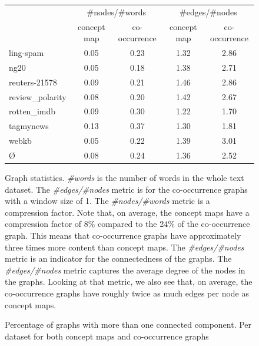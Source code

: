 

\begin{figure}[ht]
\centering
\begin{tabular}{lcccc}
{} &  \multicolumn{2}{c}{\#nodes/\#words} &  \multicolumn{2}{c}{\#edges/\#nodes} \\
{} & concept map &  co-occurrence &  concept map &  co-occurrence \\
\midrule
ling-spam       & 0.05 & 0.23 & 1.32 & 2.86 \\
ng20            & 0.05 & 0.18 & 1.38 & 2.71 \\
reuters-21578   & 0.09 & 0.21 & 1.46 & 2.86 \\
review\_polarity & 0.08 & 0.20 & 1.42 & 2.67 \\
rotten\_imdb     & 0.09 & 0.30 & 1.22 & 1.70 \\
tagmynews       & 0.13 & 0.37 & 1.30 & 1.81 \\
webkb           & 0.05 & 0.22 & 1.39 & 3.01 \\
\midrule
\O{}            & 0.08 & 0.24 & 1.36 & 2.52 \\
\bottomrule
\end{tabular}
\caption{Graph statistics. \textit{\#words} is the number of words in the whole text dataset. The \textit{\#edges/\#nodes} metric is for the co-occurrence graphs with a window size of 1. The \textit{\#nodes/\#words} metric is a compression factor. Note that, on average, the concept maps have a compression factor of 8\% compared to the 24\% of the co-occurrence graph. This means that co-occurrence graphs have approximately three times more content than concept maps. The \textit{\#edges/\#nodes} metric is an indicator for the connectedness of the graphs. The \textit{\#edges/\#nodes} metric captures the average degree of the nodes in the graphs. Looking at that metric, we also see that, on average, the co-occurrence graphs have roughly twice as much edges per node as concept maps.}
\end{figure}

\begin{figure}[ht]
\centering
\missingfigure[figcolor=white]{}
\caption{Percentage of graphs with more than one connected component. Per dataset for both concept maps and co-occurrence graphs}
\end{figure}

